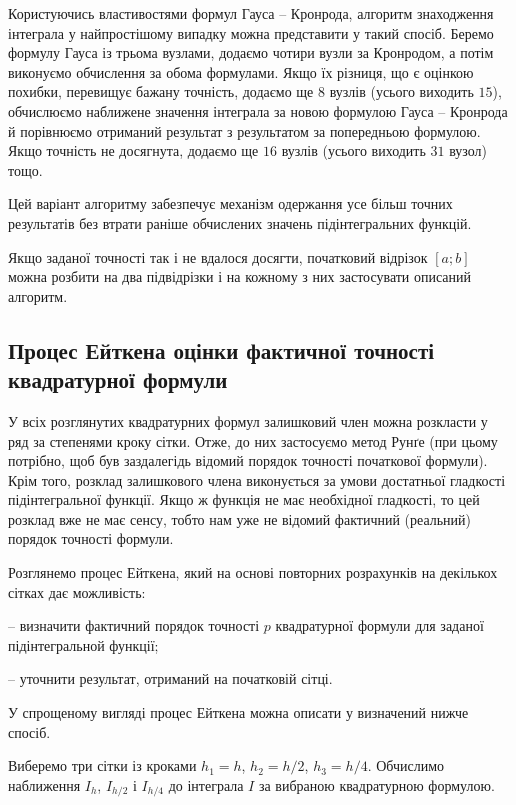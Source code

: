 \documentclass[14pt,twoside]{extreport}
\theoremstyle{mystyle}
\numberwithin{equation}{chapter}
\begin{document}
Користуючись властивостями формул Гауса -- Кронрода, алгоритм знаходження інтеграла у найпростішому випадку можна представити у такий спосіб. Беремо формулу Гауса із трьома вузлами, додаємо чотири вузли за Кронродом, а потім виконуємо обчислення за обома формулами. Якщо їх різниця, що є оцінкою похибки, перевищує бажану точність, додаємо ще $8$ вузлів (усього виходить $15$), обчислюємо наближене значення інтеграла за новою формулою Гауса -- Кронрода й порівнюємо отриманий результат з результатом за попередньою формулою. Якщо точність не досягнута, додаємо ще $16$ вузлів (усього виходить $31$ вузол) тощо.

Цей варіант алгоритму забезпечує механізм одержання усе більш точних результатів без втрати раніше обчислених значень підінтегральних функцій.

Якщо заданої точності так і не вдалося досягти, початковий відрізок $[a; b]$ можна розбити на два підвідрізки і на кожному з них застосувати описаний алгоритм.

\subsection{Процес Ейткена оцінки фактичної точності квадратурної формули}

У всіх розглянутих квадратурних формул залишковий член можна розкласти у ряд за степенями кроку сітки. Отже, до них застосуємо метод Рунґе (при цьому потрібно, щоб був заздалегідь відомий порядок точності початкової формули). Крім того, розклад залишкового члена виконується за умови достатньої гладкості підінтегральної функції. Якщо ж функція не має необхідної гладкості, то цей розклад вже не має сенсу, тобто нам уже не відомий фактичний (реальний) порядок точності формули.

Розглянемо процес Ейткена, який на основі повторних розрахунків на декількох сітках дає можливість:

-- визначити фактичний порядок точності $p$ квадратурної формули для заданої підінтегральной функції;

-- уточнити результат, отриманий на початковій сітці.

У спрощеному вигляді процес Ейткена можна описати у визначений нижче спосіб.

Виберемо три сітки із кроками $h_1 = h$, $h_2 = h/2$, $h_3 = h/4$. Обчислимо наближення $I_h$, $I_{h/2}$ і $I_{h/4}$ до інтеграла $I$ за вибраною квадратурною формулою.
\end{document}
